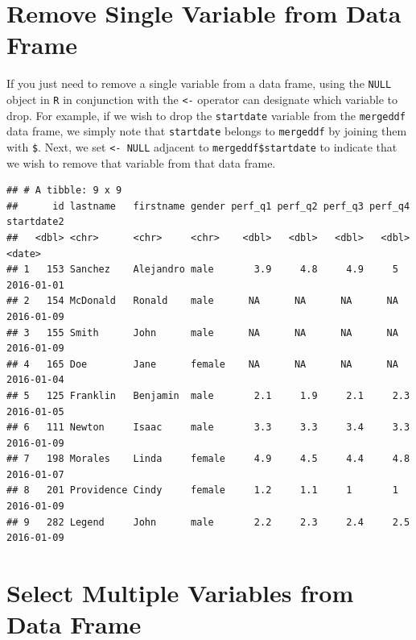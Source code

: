 \documentclass[]{book}
\newenvironment{Shaded}{\begin{snugshade}}{\end{snugshade}}
\newcommand{\StringTok}[1]{\textcolor[rgb]{0.31,0.60,0.02}{#1}}
\newcommand{\CommentTok}[1]{\textcolor[rgb]{0.56,0.35,0.01}{\textit{#1}}}
\newcommand{\OtherTok}[1]{\textcolor[rgb]{0.56,0.35,0.01}{#1}}
\newcommand{\OperatorTok}[1]{\textcolor[rgb]{0.81,0.36,0.00}{\textbf{#1}}}
\newcommand{\NormalTok}[1]{#1}
\begin{document}
\section{Remove Single Variable from Data
Frame}\label{remove-single-variable-from-data-frame}

If you just need to remove a single variable from a data frame, using
the \texttt{NULL} object in \texttt{R} in conjunction with the
\texttt{\textless{}-} operator can designate which variable to drop. For
example, if we wish to drop the \texttt{startdate} variable from the
\texttt{mergeddf} data frame, we simply note that \texttt{startdate}
belongs to \texttt{mergeddf} by joining them with \texttt{\$}. Next, we
set \texttt{\textless{}-\ NULL} adjacent to \texttt{mergeddf\$startdate}
to indicate that we wish to remove that variable from that data frame.

\begin{Shaded}
\end{Shaded}

\begin{verbatim}
## # A tibble: 9 x 9
##      id lastname   firstname gender perf_q1 perf_q2 perf_q3 perf_q4 startdate2
##   <dbl> <chr>      <chr>     <chr>    <dbl>   <dbl>   <dbl>   <dbl> <date>    
## 1   153 Sanchez    Alejandro male       3.9     4.8     4.9     5   2016-01-01
## 2   154 McDonald   Ronald    male      NA      NA      NA      NA   2016-01-09
## 3   155 Smith      John      male      NA      NA      NA      NA   2016-01-09
## 4   165 Doe        Jane      female    NA      NA      NA      NA   2016-01-04
## 5   125 Franklin   Benjamin  male       2.1     1.9     2.1     2.3 2016-01-05
## 6   111 Newton     Isaac     male       3.3     3.3     3.4     3.3 2016-01-09
## 7   198 Morales    Linda     female     4.9     4.5     4.4     4.8 2016-01-07
## 8   201 Providence Cindy     female     1.2     1.1     1       1   2016-01-09
## 9   282 Legend     John      male       2.2     2.3     2.4     2.5 2016-01-09
\end{verbatim}

\section{Select Multiple Variables from Data
Frame}\label{select-multiple-variables-from-data-frame}
\end{document}
